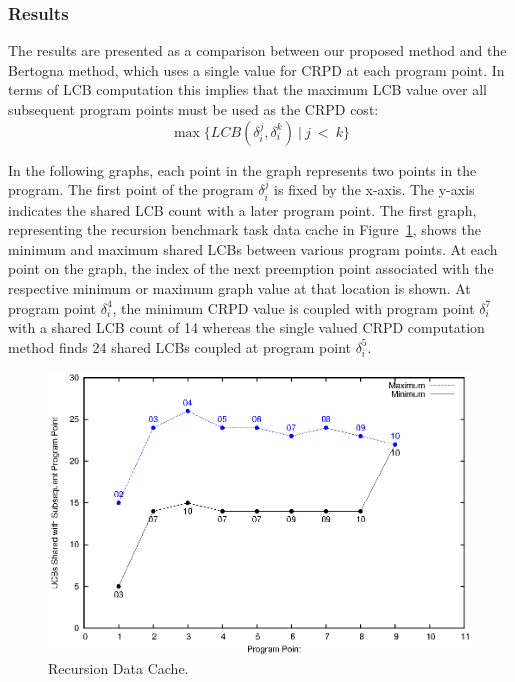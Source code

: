 \subsubsection{Results}
The results are presented as a comparison between our proposed method and the Bertogna method\cite{bertogna:11}, which uses a single value for CRPD at each program point.  In terms of LCB computation this implies that the maximum LCB value over all subsequent program points must be used as the CRPD cost:
\begin{equation}
  \max\{LCB(\delta_i^j,\delta_i^k)\ \vert\ j\ <\ k\}
\end{equation}
%

In the following graphs, each point in the graph represents two points in the program. The first point of the program ${\delta_i^j}$ is fixed by the x-axis. The y-axis indicates the shared LCB count with a later program
point. The first graph, representing the recursion benchmark task data cache in Figure~\ref{fig:recusion_data_cache}, shows the minimum and maximum shared LCBs between various program
points. At each point on the graph, the index of the next preemption point associated with the respective minimum or maximum graph value at that location is shown.  At program point ${\delta_i^4}$, the minimum CRPD value is coupled with program point ${\delta_i^7}$ with a shared LCB count of 14 whereas the single valued CRPD computation method finds 24 shared LCBs coupled at program point ${\delta_i^5}$.
%
\begin{figure}[h!]
\vspace{-10pt}
\begin{center}
\includegraphics[width=\linewidth]{eps/recursion-dcache.eps}
\caption{Recursion Data Cache.}
\label{fig:recusion_data_cache}
\end{center}
\vspace{-10pt}
\end{figure}

